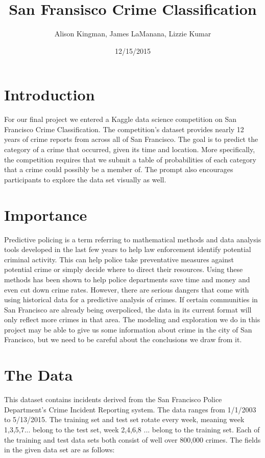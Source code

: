 \documentclass[11pt]{article}
\title{San Fransisco Crime Classification}
\author{Alison Kingman, James LaManana, Lizzie Kumar}
\date{12/15/2015}
\begin{document}


\maketitle

\section*{Introduction}

For our final project we entered a Kaggle data science competition on San Francisco Crime Classification. The competition's dataset provides nearly 12 years of crime reports from across all of San Francisco. The goal is to predict the category of a crime that occurred, given its time and location. More specifically, the competition requires that we submit a table of probabilities of each category that a crime could possibly be a member of.  The prompt also encourages participants to explore the data set visually as well.	
 
\section*{Importance}

 Predictive policing is a term referring to mathematical methods and data analysis tools developed in the last few years to help law enforcement identify potential criminal activity. This can help police take preventative measures against potential crime or simply decide where to direct their resources. Using these methods has been shown to help police departments save time and money and even cut down crime rates. However, there are serious dangers that come with using historical data for a predictive analysis of crimes. If certain communities in San Francisco are already being overpoliced, the data in its current format will only reflect more crimes in that area. The modeling and exploration we do in this project may be able to give us some information about crime in the city of San Francisco, but we need to be careful about the conclusions we draw from it.

\section*{The Data}

This dataset contains incidents derived from the San Francisco Police Department's Crime Incident Reporting system. The data ranges from 1/1/2003 to 5/13/2015. The training set and test set rotate every week, meaning week 1,3,5,7... belong to the test set, week 2,4,6,8 ... belong to the training set.  Each of the training and test data sets both consist of well over 800,000 crimes. The fields in the given data set are as follows: 
 
\end{document}
